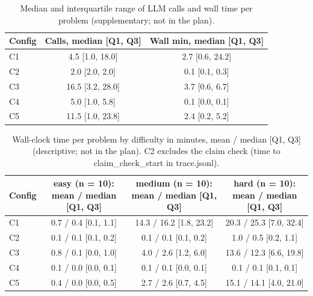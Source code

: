 
\begin{table}[t]
\centering
\footnotesize
\setlength{\tabcolsep}{3pt}
\caption{Median and interquartile range of LLM calls and wall time per problem (supplementary; not in the plan).}
\label{tab:medians}
\begin{tabular}{lcc}
\toprule
Config & Calls, median {[}Q1, Q3{]} & Wall min, median {[}Q1, Q3{]} \\
\midrule
C1 & 4.5 {[}1.0, 18.0{]} & 2.7 {[}0.6, 24.2{]} \\
C2 & 2.0 {[}2.0, 2.0{]} & 0.1 {[}0.1, 0.3{]} \\
C3 & 16.5 {[}3.2, 28.0{]} & 3.7 {[}0.6, 6.7{]} \\
C4 & 5.0 {[}1.0, 5.8{]} & 0.1 {[}0.0, 0.1{]} \\
C5 & 11.5 {[}1.0, 23.8{]} & 2.4 {[}0.2, 5.2{]} \\
\bottomrule
\end{tabular}
\end{table}

\begin{table}[t]
\centering
\scriptsize
\setlength{\tabcolsep}{3pt}
\caption{Wall-clock time per problem by difficulty in minutes, mean / median {[}Q1, Q3{]} (descriptive; not in the plan). C2 excludes the claim check (time to claim\_check\_start in trace.jsonl).}
\label{tab:wall-diff}
\begin{tabular}{lccc}
\toprule
Config & easy (n = 10): mean / median {[}Q1, Q3{]} & medium (n = 10): mean / median {[}Q1, Q3{]} & hard (n = 10): mean / median {[}Q1, Q3{]} \\
\midrule
C1 & 0.7 / 0.4 {[}0.1, 1.1{]} & 14.3 / 16.2 {[}1.8, 23.2{]} & 20.3 / 25.3 {[}7.0, 32.4{]} \\
C2 & 0.1 / 0.1 {[}0.1, 0.2{]} & 0.1 / 0.1 {[}0.1, 0.2{]} & 1.0 / 0.5 {[}0.2, 1.1{]} \\
C3 & 0.8 / 0.1 {[}0.0, 1.0{]} & 4.0 / 2.6 {[}1.2, 6.0{]} & 13.6 / 12.3 {[}6.6, 19.8{]} \\
C4 & 0.1 / 0.0 {[}0.0, 0.1{]} & 0.1 / 0.1 {[}0.0, 0.1{]} & 0.1 / 0.1 {[}0.1, 0.1{]} \\
C5 & 0.4 / 0.0 {[}0.0, 0.5{]} & 2.7 / 2.6 {[}0.7, 4.5{]} & 15.1 / 14.1 {[}4.0, 21.0{]} \\
\bottomrule
\end{tabular}
\end{table}

